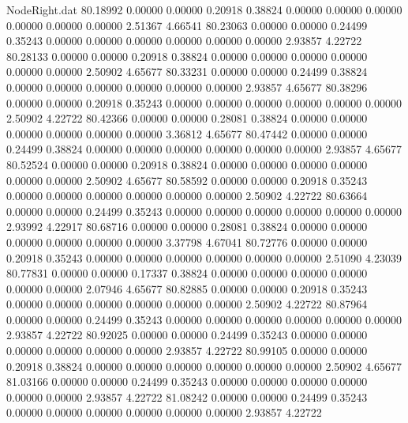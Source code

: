 \begin{filecontents}{NodeRight.dat}
  80.18992    0.00000    0.00000     0.20918    0.38824    0.00000    0.00000    0.00000    0.00000    0.00000    0.00000    2.51367    4.66541
  80.23063    0.00000    0.00000     0.24499    0.35243    0.00000    0.00000    0.00000    0.00000    0.00000    0.00000    2.93857    4.22722
  80.28133    0.00000    0.00000     0.20918    0.38824    0.00000    0.00000    0.00000    0.00000    0.00000    0.00000    2.50902    4.65677
  80.33231    0.00000    0.00000     0.24499    0.38824    0.00000    0.00000    0.00000    0.00000    0.00000    0.00000    2.93857    4.65677
  80.38296    0.00000    0.00000     0.20918    0.35243    0.00000    0.00000    0.00000    0.00000    0.00000    0.00000    2.50902    4.22722
  80.42366    0.00000    0.00000     0.28081    0.38824    0.00000    0.00000    0.00000    0.00000    0.00000    0.00000    3.36812    4.65677
  80.47442    0.00000    0.00000     0.24499    0.38824    0.00000    0.00000    0.00000    0.00000    0.00000    0.00000    2.93857    4.65677
  80.52524    0.00000    0.00000     0.20918    0.38824    0.00000    0.00000    0.00000    0.00000    0.00000    0.00000    2.50902    4.65677
  80.58592    0.00000    0.00000     0.20918    0.35243    0.00000    0.00000    0.00000    0.00000    0.00000    0.00000    2.50902    4.22722
  80.63664    0.00000    0.00000     0.24499    0.35243    0.00000    0.00000    0.00000    0.00000    0.00000    0.00000    2.93992    4.22917
  80.68716    0.00000    0.00000     0.28081    0.38824    0.00000    0.00000    0.00000    0.00000    0.00000    0.00000    3.37798    4.67041
  80.72776    0.00000    0.00000     0.20918    0.35243    0.00000    0.00000    0.00000    0.00000    0.00000    0.00000    2.51090    4.23039
  80.77831    0.00000    0.00000     0.17337    0.38824    0.00000    0.00000    0.00000    0.00000    0.00000    0.00000    2.07946    4.65677
  80.82885    0.00000    0.00000     0.20918    0.35243    0.00000    0.00000    0.00000    0.00000    0.00000    0.00000    2.50902    4.22722
  80.87964    0.00000    0.00000     0.24499    0.35243    0.00000    0.00000    0.00000    0.00000    0.00000    0.00000    2.93857    4.22722
  80.92025    0.00000    0.00000     0.24499    0.35243    0.00000    0.00000    0.00000    0.00000    0.00000    0.00000    2.93857    4.22722
  80.99105    0.00000    0.00000     0.20918    0.38824    0.00000    0.00000    0.00000    0.00000    0.00000    0.00000    2.50902    4.65677
  81.03166    0.00000    0.00000     0.24499    0.35243    0.00000    0.00000    0.00000    0.00000    0.00000    0.00000    2.93857    4.22722
  81.08242    0.00000    0.00000     0.24499    0.35243    0.00000    0.00000    0.00000    0.00000    0.00000    0.00000    2.93857    4.22722

\end{filecontents}
